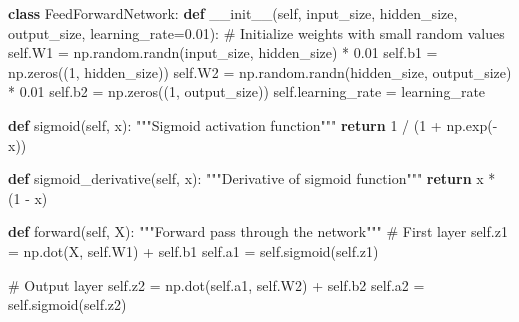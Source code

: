 \documentclass[
  letterpaper,
  DIV=11,
  numbers=noendperiod]{scrreprt}
\newenvironment{Shaded}{\begin{snugshade}}{\end{snugshade}}
\newcommand{\CommentTok}[1]{\textcolor[rgb]{0.37,0.37,0.37}{#1}}
\newcommand{\ControlFlowTok}[1]{\textcolor[rgb]{0.00,0.23,0.31}{\textbf{#1}}}
\newcommand{\DecValTok}[1]{\textcolor[rgb]{0.68,0.00,0.00}{#1}}
\newcommand{\FloatTok}[1]{\textcolor[rgb]{0.68,0.00,0.00}{#1}}
\newcommand{\FunctionTok}[1]{\textcolor[rgb]{0.28,0.35,0.67}{#1}}
\newcommand{\KeywordTok}[1]{\textcolor[rgb]{0.00,0.23,0.31}{\textbf{#1}}}
\newcommand{\NormalTok}[1]{\textcolor[rgb]{0.00,0.23,0.31}{#1}}
\newcommand{\OperatorTok}[1]{\textcolor[rgb]{0.37,0.37,0.37}{#1}}
\newcommand{\VariableTok}[1]{\textcolor[rgb]{0.07,0.07,0.07}{#1}}
\begin{document}
\begin{Shaded}
\begin{Highlighting}[]
\KeywordTok{class}\NormalTok{ FeedForwardNetwork:}
    \KeywordTok{def} \FunctionTok{\_\_init\_\_}\NormalTok{(}\VariableTok{self}\NormalTok{, input\_size, hidden\_size, output\_size, learning\_rate}\OperatorTok{=}\FloatTok{0.01}\NormalTok{):}
        \CommentTok{\# Initialize weights with small random values}
        \VariableTok{self}\NormalTok{.W1 }\OperatorTok{=}\NormalTok{ np.random.randn(input\_size, hidden\_size) }\OperatorTok{*} \FloatTok{0.01}
        \VariableTok{self}\NormalTok{.b1 }\OperatorTok{=}\NormalTok{ np.zeros((}\DecValTok{1}\NormalTok{, hidden\_size))}
        \VariableTok{self}\NormalTok{.W2 }\OperatorTok{=}\NormalTok{ np.random.randn(hidden\_size, output\_size) }\OperatorTok{*} \FloatTok{0.01}
        \VariableTok{self}\NormalTok{.b2 }\OperatorTok{=}\NormalTok{ np.zeros((}\DecValTok{1}\NormalTok{, output\_size))}
        \VariableTok{self}\NormalTok{.learning\_rate }\OperatorTok{=}\NormalTok{ learning\_rate}
    
    \KeywordTok{def}\NormalTok{ sigmoid(}\VariableTok{self}\NormalTok{, x):}
        \CommentTok{"""Sigmoid activation function"""}
        \ControlFlowTok{return} \DecValTok{1} \OperatorTok{/}\NormalTok{ (}\DecValTok{1} \OperatorTok{+}\NormalTok{ np.exp(}\OperatorTok{{-}}\NormalTok{x))}
    
    \KeywordTok{def}\NormalTok{ sigmoid\_derivative(}\VariableTok{self}\NormalTok{, x):}
        \CommentTok{"""Derivative of sigmoid function"""}
        \ControlFlowTok{return}\NormalTok{ x }\OperatorTok{*}\NormalTok{ (}\DecValTok{1} \OperatorTok{{-}}\NormalTok{ x)}
    
    \KeywordTok{def}\NormalTok{ forward(}\VariableTok{self}\NormalTok{, X):}
        \CommentTok{"""Forward pass through the network"""}
        \CommentTok{\# First layer}
        \VariableTok{self}\NormalTok{.z1 }\OperatorTok{=}\NormalTok{ np.dot(X, }\VariableTok{self}\NormalTok{.W1) }\OperatorTok{+} \VariableTok{self}\NormalTok{.b1}
        \VariableTok{self}\NormalTok{.a1 }\OperatorTok{=} \VariableTok{self}\NormalTok{.sigmoid(}\VariableTok{self}\NormalTok{.z1)}
        
        \CommentTok{\# Output layer}
        \VariableTok{self}\NormalTok{.z2 }\OperatorTok{=}\NormalTok{ np.dot(}\VariableTok{self}\NormalTok{.a1, }\VariableTok{self}\NormalTok{.W2) }\OperatorTok{+} \VariableTok{self}\NormalTok{.b2}
        \VariableTok{self}\NormalTok{.a2 }\OperatorTok{=} \VariableTok{self}\NormalTok{.sigmoid(}\VariableTok{self}\NormalTok{.z2)}
        

\end{Highlighting}
\end{Shaded}
\end{document}
